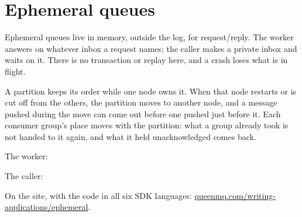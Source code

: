
\section{Ephemeral queues}

Ephemeral queues live in memory, outside the log, for request/reply. The worker answers on whatever
inbox a request names; the caller makes a private inbox and waits on it. There is no transaction or
replay here, and a crash loses what is in flight.

A partition keeps its order while one node owns it. When that node restarts or is cut off from the
others, the partition moves to another node, and a message pushed during the move can come out
before one pushed just before it. Each consumer group's place moves with the partition: what a
group already took is not handed to it again, and what it held unacknowledged comes back.

The worker:


The caller:




On the site, with the code in all six SDK languages: \href{https://queenmq.com/writing-applications/ephemeral/}{queenmq.com/writing-applications/ephemeral}.
